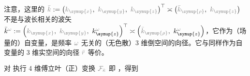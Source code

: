 注意，这里的 $\mathcolor{gray}{\bar{k}} := \left( \mathcolor{gray}{k_{\symup{x}}},~ \mathcolor{gray}{k_{\symup{y}}},~ \mathcolor{gray}{k_{\symup{z}}} \right)^\top \asymp \left( \mathcolor{gray}{\bar{k}_{\symup{\rho}}},~ \mathcolor{gray}{k_{\symup{z}}} \right)$ 不是与波长相关的波矢 $\bar{k}^{\mathcolor{gray}{\omega}} := \left( \mathcolor{gray}{k_{\symup{x}}},~ \mathcolor{gray}{k_{\symup{y}}},~ k_{\symup{z}}^{\mathcolor{gray}{\omega}} \right)^\top \asymp \left( \mathcolor{gray}{\bar{k}_{\symup{\rho}}},~ k_{\symup{z}}^{\mathcolor{gray}{\omega}} \right)$，它作为（场量的）自变量，是频率 $\mathcolor{gray}{\omega}$ 无关的（无色散）3 维倒空间的向径。它与同样作为自变量的 3 维实空间的向径 $\mathcolor{gray}{\bar{r}}$ 等价。

对  执行 4 维傅立叶（正）变换 $\mathcolor{gray}{\mathcal F_{\bar{\kappa}}}$ 即 ，得到
